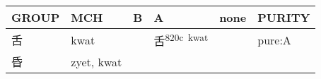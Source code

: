 \documentclass[14pt,a4paper]{scrartcl}
\begin{document}
\begin{longtable}[c]{@{}llllll@{}}
\toprule
\begin{minipage}[b]{0.14\columnwidth}\raggedright\strut
GROUP
\strut\end{minipage} &
\begin{minipage}[b]{0.14\columnwidth}\raggedright\strut
MCH
\strut\end{minipage} &
\begin{minipage}[b]{0.14\columnwidth}\raggedright\strut
B
\strut\end{minipage} &
\begin{minipage}[b]{0.14\columnwidth}\raggedright\strut
A
\strut\end{minipage} &
\begin{minipage}[b]{0.14\columnwidth}\raggedright\strut
none
\strut\end{minipage} &
\begin{minipage}[b]{0.14\columnwidth}\raggedright\strut
PURITY
\strut\end{minipage}\tabularnewline
\midrule
\endhead
\begin{minipage}[t]{0.14\columnwidth}\raggedright\strut
舌
\strut\end{minipage} &
\begin{minipage}[t]{0.14\columnwidth}\raggedright\strut
kwat
\strut\end{minipage} &
\begin{minipage}[t]{0.14\columnwidth}\raggedright\strut
\strut\end{minipage} &
\begin{minipage}[t]{0.14\columnwidth}\raggedright\strut
舌\textsuperscript{820c~kwat}
\strut\end{minipage} &
\begin{minipage}[t]{0.14\columnwidth}\raggedright\strut
\strut\end{minipage} &
\begin{minipage}[t]{0.14\columnwidth}\raggedright\strut
pure:A
\strut\end{minipage}\tabularnewline
\begin{minipage}[t]{0.14\columnwidth}\raggedright\strut
昏
\strut\end{minipage} &
\begin{minipage}[t]{0.14\columnwidth}\raggedright\strut
zyet, kwat
\strut\end{minipage} &
\begin{minipage}[t]{0.14\columnwidth}\raggedright\strut
\strut\end{minipage} &
\begin{minipage}[t]{0.14\columnwidth}\raggedright\strut

\end{minipage}
\end{longtable}
\end{document}
